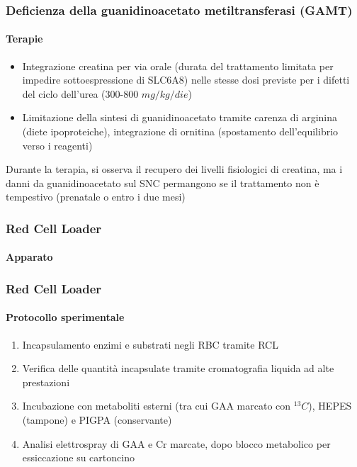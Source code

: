 \begin{frame}
\frametitle {Deficienza della guanidinoacetato metiltransferasi (GAMT)}
\framesubtitle {Terapie}
\begin{itemize}
	\item Integrazione creatina per via orale (durata del trattamento limitata per impedire sottoespressione di SLC6A8) nelle stesse dosi previste per i difetti del ciclo dell'urea (300-800 $mg/kg/die$)
	\item Limitazione della sintesi di guanidinoacetato tramite carenza di arginina (diete ipoproteiche), integrazione di ornitina (spostamento dell'equilibrio verso i reagenti)
\end{itemize}

Durante la terapia, si osserva il recupero dei livelli fisiologici di creatina, ma i danni da guanidinoacetato sul SNC permangono se il trattamento non \`e tempestivo (prenatale o entro i due mesi)

\end{frame}

\begin{frame}
\frametitle {Red Cell Loader}
\framesubtitle {Apparato}
\begin{figure}
	\centerline{}
\end{figure}

\end{frame}

\begin{frame}
\frametitle {Red Cell Loader}
\framesubtitle {Protocollo sperimentale}
\begin{enumerate}
	\item Incapsulamento enzimi e substrati negli RBC tramite RCL
	\item Verifica delle quantit\`a incapsulate tramite cromatografia liquida ad alte prestazioni
	\item Incubazione con metaboliti esterni (tra cui GAA marcato con $^{13}C$), HEPES (tampone) e PIGPA (conservante)
	\item Analisi elettrospray di GAA e Cr marcate, dopo blocco metabolico per essiccazione su cartoncino
\end{enumerate}

\end{frame}

